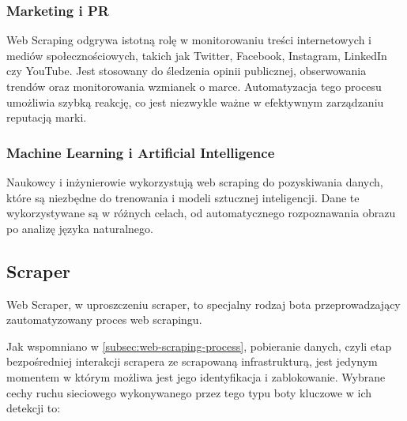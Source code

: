 \subsubsection{Marketing i PR}

Web Scraping odgrywa istotną rolę w monitorowaniu treści internetowych i mediów społecznościowych, takich jak Twitter, Facebook, Instagram, LinkedIn czy YouTube.
Jest stosowany do śledzenia opinii publicznej, obserwowania trendów oraz monitorowania wzmianek o marce.
Automatyzacja tego procesu umożliwia szybką reakcję, co jest niezwykle ważne w efektywnym zarządzaniu reputacją marki\cite{monitoring-social-media}.

\subsubsection{Machine Learning i Artificial Intelligence}

Naukowcy i inżynierowie wykorzystują web scraping do pozyskiwania danych, które są niezbędne do trenowania i modeli sztucznej inteligencji\cite{openai-data-collection}.
Dane te wykorzystywane są w różnych celach, od automatycznego rozpoznawania obrazu po analizę języka naturalnego.

\subsection{Scraper}

Web Scraper, w uproszczeniu scraper, to specjalny rodzaj bota przeprowadzający zautomatyzowany proces web scrapingu.

Jak wspomniano w \autoref{subsec:web-scraping-process}, pobieranie danych, czyli etap bezpośredniej interakcji scrapera ze scrapowaną infrastrukturą,
jest jedynym momentem w którym możliwa jest jego identyfikacja i zablokowanie.
Wybrane cechy ruchu sieciowego wykonywanego przez tego typu boty kluczowe w ich detekcji to:

